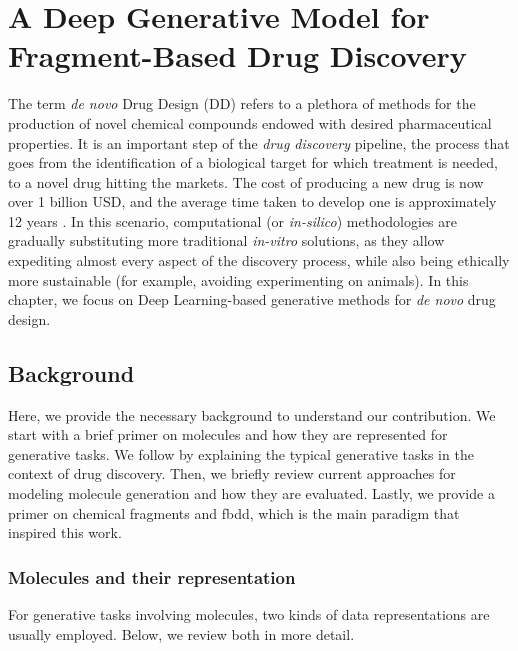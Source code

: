 \chapter{A Deep Generative Model for Fragment-Based Drug Discovery} %
\label{ch:deep-generative-learning-drug-discovery}
The term \emph{de novo} Drug Design (DD) refers to a plethora of methods for the production of novel chemical compounds endowed with desired pharmaceutical properties. It is an important step of the \emph{drug discovery} pipeline, the process that goes from the identification of a biological target for which treatment is needed, to a novel drug hitting the markets. The cost of producing a new drug is now over 1 billion USD, and the average time taken to develop one is approximately 12 years \citep{dimasi2016drugdiscoverycost}. In this scenario, computational (or \emph{in-silico}) methodologies are gradually substituting more traditional \emph{in-vitro} solutions, as they allow expediting almost every aspect of the discovery process, while also being ethically more sustainable (for example, avoiding experimenting on animals). In this chapter, we focus on Deep Learning-based generative methods for \emph{de novo} drug design.

\section{Background}
Here, we provide the necessary background to understand our contribution. We start with a brief primer on molecules and how they are represented for generative tasks. We follow by explaining the typical generative tasks in the context of drug discovery. Then, we briefly review current approaches for modeling molecule generation and how they are evaluated. Lastly, we provide a primer on chemical fragments and \gls{fbdd}, which is the main paradigm that inspired this work.

\subsection{Molecules and their representation}
For generative tasks involving molecules, two kinds of data representations are usually employed. Below, we review both in more detail.

